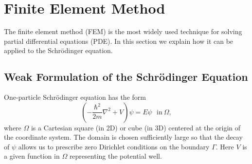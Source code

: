 \section{Finite Element Method}

The finite element method (FEM) is the most widely used technique for solving partial
differential equations (PDE). In this section we explain how it can be applied to the 
Schr\"odinger equation.

\subsection{Weak Formulation of the Schr\"odinger Equation}

One-particle Schr\"odinger equation has the form
\begin{equation}\label{schPDE}
  \left(-\frac{\hbar^2}{2m}\nabla^2 + V \right) \psi=E\psi\ \ \ \mbox{in}\ \Omega,
\end{equation}
where $\Omega$ is a Cartesian square (in 2D) or cube (in 3D) 
centered at the origin of the coordinate 
system. The domain is chosen sufficiently large so that the decay of $\psi$
allows us to prescribe zero Dirichlet conditions on the boundary $\Gamma$.
Here $V$ is a given function in $\Omega$ representing the potential well.

